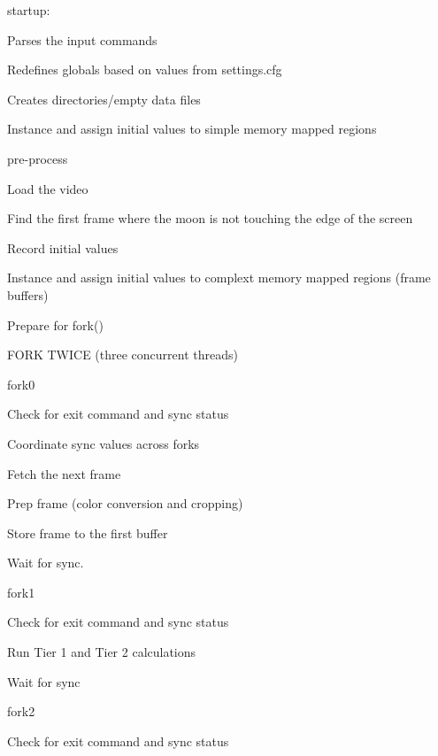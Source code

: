 \begin{DoxyItemize}
\item startup\+:
\begin{DoxyItemize}
\item Parses the input commands
\item Redefines globals based on values from settings.\+cfg
\item Creates directories/empty data files
\item Instance and assign initial values to simple memory mapped regions
\end{DoxyItemize}
\item pre-\/process
\begin{DoxyItemize}
\item Load the video
\item Find the first frame where the moon is not touching the edge of the screen
\item Record initial values
\item Instance and assign initial values to complext memory mapped regions (frame buffers)
\item Prepare for fork()
\end{DoxyItemize}
\item F\+O\+RK T\+W\+I\+CE (three concurrent threads)
\begin{DoxyItemize}
\item fork0
\begin{DoxyItemize}
\item Check for exit command and sync status
\item Coordinate sync values across forks
\item Fetch the next frame
\item Prep frame (color conversion and cropping)
\item Store frame to the first buffer
\item Wait for sync.
\end{DoxyItemize}
\item fork1
\begin{DoxyItemize}
\item Check for exit command and sync status
\item Run Tier 1 and Tier 2 calculations
\item Wait for sync
\end{DoxyItemize}
\item fork2
\begin{DoxyItemize}
\item Check for exit command and sync status

\end{DoxyItemize}
\end{DoxyItemize}
\end{DoxyItemize}
